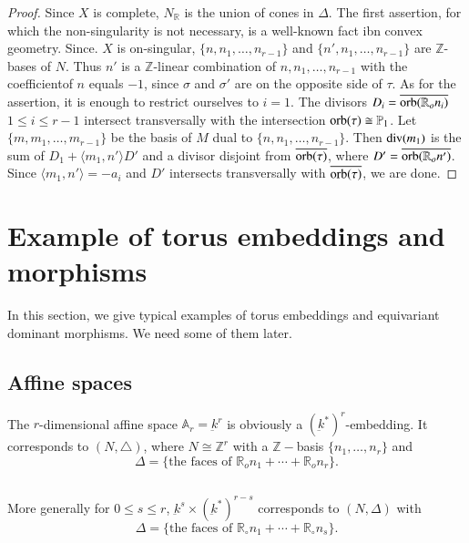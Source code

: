 \begin{proof}
Since $X$ is complete, $N_{\mathbb{R}}$ is the union of cones in
$\Delta$. The first assertion, for which the non-singularity is not
necessary, is a well-known fact ibn convex geometry. Since. $X$ is
on-singular, $\{n , n_{1}, \ldots , n_{r-1}\}$ and $\{n', n_{1}, \ldots
, n_{r-1}\}$ are $\mathbb{Z}$-bases of $N$. Thus $n'$ is a
$\mathbb{Z}$-linear combination of $n, n_{1}, \ldots , n_{r-1}$ with
the coefficient\pageoriginale of $n$ equals $-1$, since $\sigma$ and
$\sigma'$ are 
on the opposite side of $\tau$. As for the assertion, it is enough to
restrict ourselves to $i = 1$. The divisors $D_{i} =
\overline{\operatorname{orb}(\mathbb{R}_{o}n_{i})}$ $1 \leq i \leq r-1$ intersect
transversally with the intersection $\operatorname{orb}(\tau)  
\cong \mathbb{P}_{1}$. Let $\{m, m_{1}, \ldots , m_{r-1}\}$ be the
basis of $M$ dual to $\{n, n_{1}, \ldots , n_{r-1}\}$. Then
$\operatorname{div}(m_{1})$ is the sum of $D_{1} +  \langle m_{1}, n' \rangle D'$
and a divisor 
disjoint from $\overline{\operatorname{orb}(\tau)}$, where $D' =
\overline{\operatorname{orb}(\mathbb{R}_{o}n')}$. Since $\langle m_{1}, n' \rangle =
-a_{i}$ and $D'$ intersects transversally with
$\overline{\operatorname{orb}(\tau)}$, we are done.  
\end{proof}


\section{Example of torus embeddings and morphisms}\label{chap1:sec7}

 	In this section, we give typical examples of torus embeddings
        and equivariant dominant morphisms. We need some of them
        later.  
 
 \subsection{Affine spaces}\label{chap1:subsec7.1} 
 The $r$-dimensional affine space  $\mathbb{A}_{r} = \underbar{k}^{r}$ is
 obviously a $(\underbar{k}^{*})^{r}$-embedding. It corresponds to
 $(N, \triangle)$, where $N \cong \mathbb{Z}^{r}$ with a
 $\mathbb{Z}-$basis $\{n_{1} , \ldots, n_{r}\}$ and   
 $$
 \Delta = \{ \text{the faces of } \mathbb{R}_{o}n_{1} +\cdots +
   \mathbb{R}_{o}n_{r}\}. 
 $$ 
 
 \subsection{}\label{chap1:subsec7.2} %
 More generally for $0 \leq s \leq r$, $\underbar{k}^{s} \times
 (\underbar{k}^{*})^{r-s} $ corresponds to $(N, \Delta)$ with 
 $$
 \Delta = \{\text{the faces of } \mathbb{R}_{\circ}n_{1} + \cdots +  
 \mathbb{R}_{\circ}n_{s}\}.  
  $$


